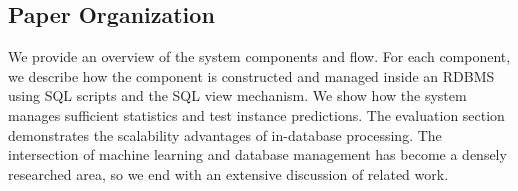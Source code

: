 \subsection{Paper Organization}
We provide an overview of the system components and flow. For each component, we describe how the component is constructed and managed inside an RDBMS using SQL scripts and the SQL view mechanism. We show how the system manages sufficient statistics and test instance predictions. The evaluation section demonstrates the scalability advantages of in-database processing. The intersection of machine learning and database management has become a densely researched area, so we end with an extensive discussion of related work. 





